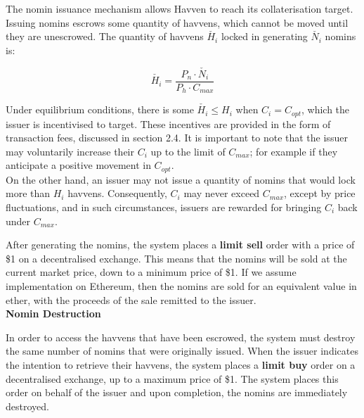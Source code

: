 \noindent The nomin issuance mechanism allows Havven to reach its collaterisation target.
Issuing nomins escrows some quantity of havvens, which cannot be moved until they are unescrowed.
The quantity of havvens $\check{H_i}$ locked in generating $\check{N_i}$ nomins is:

\begin{equation}
\check{H_i} = \frac{P_n \cdot \check{N_i}}{P_h \cdot C_{max}}  \label{eq:escrowed}
\end{equation}

\vspace{2 mm}

\noindent Under equilibrium conditions, there is some $\check{H_i} \leq H_i$ when $C_i = C_{opt}$, which the issuer is incentivised to target. These incentives are provided in the form of transaction fees, discussed in section 2.4. It is important to note that the issuer may voluntarily increase their $C_i$ up to the limit of $C_{max}$; for example if they anticipate a positive movement in $C_{opt}$. \\

\noindent On the other hand, an issuer may not issue a quantity of nomins that would lock more than $H_i$ havvens.  Consequently, $C_i$ may never exceed $C_{max}$, except by price fluctuations, and in such circumstances, issuers are rewarded for bringing $C_i$ back under $C_{max}$. \\

\newpage

\noindent After generating the nomins, the system places a \textbf{limit sell} order with a price of \$1 on a decentralised exchange. This means that the nomins will be sold at the current market price, down to a minimum price of \$1. If we assume implementation on Ethereum, then the nomins are sold for an equivalent value in ether, with the proceeds of the sale remitted to the issuer. \\

\noindent \textbf{Nomin Destruction}

\vspace{1mm}

\noindent In order to access the havvens that have been escrowed, the system must destroy the same number of nomins that were originally issued. When the issuer indicates the intention to retrieve their havvens, the system places a \textbf{limit buy} order on a decentralised exchange, up to a maximum price of \$1. The system places this order on behalf of the issuer and upon completion, the nomins are immediately destroyed. \\


